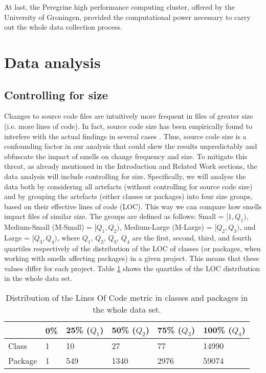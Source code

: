 At last, the Peregrine high performance computing cluster, offered by the University of Groningen, provided the computational power necessary to carry out the whole data collection process.

\section{Data analysis}\label{c5:sec:data-analysis}
\subsection{Controlling for size}\label{c5:sec:data-analysis-size}
Changes to source code files are intuitively more frequent in files of greater size (i.e. more lines of code). In fact, source code size has been empirically found to interfere with the actual findings in several cases \cite{ElEmam2001,Zhou2009}. Thus, source code size is a confounding factor in our analysis that could skew the results unpredictably and obfuscate the impact of smells on change frequency and size.
To mitigate this threat, as already mentioned in the Introduction and Related Work sections, the data analysis will include controlling for size. Specifically, we will analyse the data both by considering all artefacts (without controlling for source code size) and by grouping the artefacts (either classes or packages) into four size groups, based on their effective lines of code (LOC). This way we can compare how smells impact files of similar size.
The groups are defined as follows: Small = $[1, Q_1)$, Medium-Small (M-Small) = $[Q_1, Q_2)$, Medium-Large (M-Large) = $[Q_2, Q_3)$, and Large = $[Q_3, Q_4)$, where $Q_1$, $Q_2$, $Q_3$, $Q_4$ are the first, second, third, and fourth quartiles respectively of the distribution of the LOC of classes (or packages, when working with smells affecting packages) in a given project. This means that these values differ for each project. Table \ref{c5:tab:quartiles-loc} shows the quartiles of the LOC distribution in the whole data set.


\begin{table}[]
    \caption{Distribution of the Lines Of Code metric in classes and packages in the whole data set.}
    \centering
    \label{c5:tab:quartiles-loc}
    \begin{tabular}{@{}llllll@{}}
    \toprule
            & \textbf{0\%} & \textbf{25\% ($Q_1$)} & \textbf{50\% ($Q_2$)} & \textbf{75\% ($Q_3$)} & \textbf{100\% ($Q_4$)} \\ \midrule
    Class   & 1   & 10        & 27        & 77        & 14990 \\
    Package & 1   & 549       & 1340      & 2976      & 59074 \\ \bottomrule
    \end{tabular}
\end{table}

